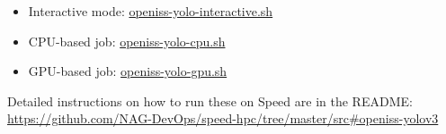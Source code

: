 \begin{itemize}
	\item Interactive mode:
  \href{https://github.com/NAG-DevOps/speed-hpc/blob/master/src/openiss-yolo-interactive.sh}
  {openiss-yolo-interactive.sh}
	\item CPU-based job:
  \href{https://github.com/NAG-DevOps/speed-hpc/blob/master/src/openiss-yolo-cpu.sh}
  {openiss-yolo-cpu.sh}
	\item GPU-based job:
  \href{https://github.com/NAG-DevOps/speed-hpc/blob/master/src/openiss-yolo-gpu.sh}
  {openiss-yolo-gpu.sh}
\end{itemize}

\noindent Detailed instructions on how to run these on Speed are in the README: 
\url{https://github.com/NAG-DevOps/speed-hpc/tree/master/src#openiss-yolov3}